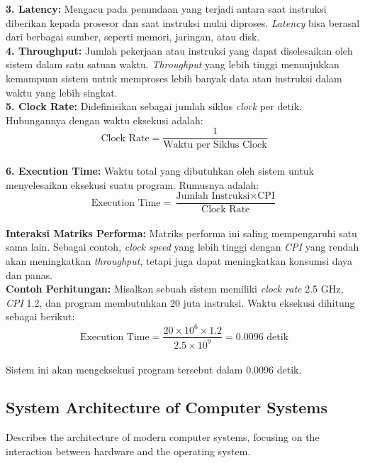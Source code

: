 \documentclass[12pt]{article}
\begin{document}
\textbf{3. Latency:} Mengacu pada penundaan yang terjadi antara saat instruksi diberikan kepada prosesor dan saat instruksi mulai diproses. \textit{Latency} bisa berasal dari berbagai sumber, seperti memori, jaringan, atau disk.\\

\textbf{4. Throughput:} Jumlah pekerjaan atau instruksi yang dapat diselesaikan oleh sistem dalam satu satuan waktu. \textit{Throughput} yang lebih tinggi menunjukkan kemampuan sistem untuk memproses lebih banyak data atau instruksi dalam waktu yang lebih singkat.\\

\textbf{5. Clock Rate:} Didefinisikan sebagai jumlah siklus \textit{clock} per detik. Hubungannya dengan waktu eksekusi adalah:\\

\begin{equation}
\text{Clock Rate} = \frac{1}{\text{Waktu per Siklus Clock}}
\end{equation}\\

\textbf{6. Execution Time:} Waktu total yang dibutuhkan oleh sistem untuk menyelesaikan eksekusi suatu program. Rumusnya adalah:\\

\begin{equation}
\text{Execution Time} = \frac{\text{Jumlah Instruksi} \times \text{CPI}}{\text{Clock Rate}}
\end{equation}\\

\textbf{Interaksi Matriks Performa:} Matriks performa ini saling mempengaruhi satu sama lain. Sebagai contoh, \textit{clock speed} yang lebih tinggi dengan \textit{CPI} yang rendah akan meningkatkan \textit{throughput}, tetapi juga dapat meningkatkan konsumsi daya dan panas.\\

\textbf{Contoh Perhitungan:} Misalkan sebuah sistem memiliki \textit{clock rate} 2.5 GHz, \textit{CPI} 1.2, dan program membutuhkan 20 juta instruksi. Waktu eksekusi dihitung sebagai berikut:\\

\[
\text{Execution Time} = \frac{20 \times 10^6 \times 1.2}{2.5 \times 10^9} = 0.0096 \text{ detik}
\]\\

Sistem ini akan mengeksekusi program tersebut dalam 0.0096 detik.\\

\subsection{System Architecture of Computer Systems}
Describes the architecture of modern computer systems, focusing on the interaction between hardware and the operating system.
\end{document}
